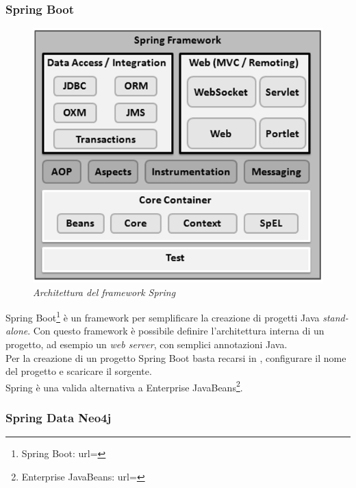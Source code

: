 \subsubsection{Spring Boot}
\begin{figure}[h!]
	\centering
	\includegraphics[scale=0.45]{immagini/spring.png}
	\caption{\textit{Architettura del \gls{framework} Spring} }
\end{figure}
Spring Boot\footnote{Spring Boot: url= } è un \gls{framework} per semplificare la creazione di progetti Java \textit{stand-alone}. Con questo \gls{framework} è possibile definire l'architettura interna di un progetto, ad esempio un \textit{web server}, con semplici annotazioni Java.\\
Per la creazione di un progetto Spring Boot basta recarsi in , configurare il nome del progetto e scaricare il sorgente.\\
Spring è una valida alternativa a Enterprise JavaBeans\footnote{Enterprise JavaBeans: url= }.

\subsubsection{Spring Data Neo4j}

